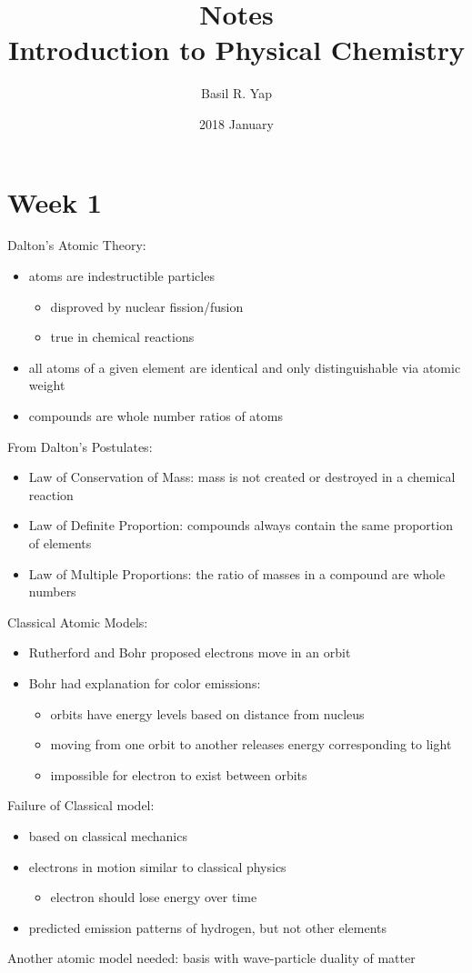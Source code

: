 \documentclass[a4paper, fleqn]{article}
\begin{document}
\title{Notes \\ Introduction to Physical Chemistry}
\author{Basil R. Yap}
\date{2018 January}
\maketitle

\section{Week 1}

Dalton's Atomic Theory: \begin{itemize}
\item atoms are indestructible particles \begin{itemize}
\item disproved by nuclear fission/fusion
\item true in chemical reactions
\end{itemize}
\item all atoms of a given element are identical and only distinguishable via atomic weight
\item compounds are whole number ratios of atoms
\end{itemize}

From Dalton's Postulates: \begin{itemize}
\item Law of Conservation of Mass: mass is not created or destroyed in a chemical reaction
\item Law of Definite Proportion: compounds always contain the same proportion of elements
\item Law of Multiple Proportions: the ratio of masses in a compound are whole numbers
\end{itemize}

Classical Atomic Models:\begin{itemize}
\item Rutherford and Bohr proposed electrons move in an orbit
\item Bohr had explanation for color emissions: \begin{itemize}
\item orbits have energy levels based on distance from nucleus
\item moving from one orbit to another releases energy corresponding to light
\item impossible for electron to exist between orbits
\end{itemize}
\end{itemize}

Failure of Classical model: \begin{itemize}
\item based on classical mechanics
\item electrons in motion similar to classical physics \begin{itemize}
\item electron should lose energy over time
\end{itemize}
\item predicted emission patterns of hydrogen, but not other elements
\end{itemize}
Another atomic model needed: basis with wave-particle duality of matter
\end{document}
